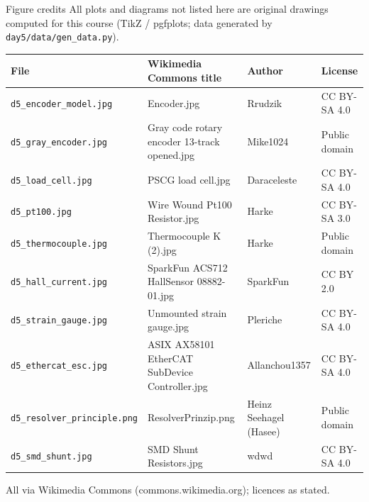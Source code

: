 \documentclass[aspectratio=169,10pt]{beamer}
\begin{document}
\begin{frame}{Figure credits}
\scriptsize
All plots and diagrams not listed here are original drawings computed for this course (TikZ / pgfplots; data generated by \texttt{day5/data/gen\_data.py}).

\vspace{2mm}
\renewcommand{\arraystretch}{1.15}
\begin{tabularx}{\linewidth}{@{}l X l l@{}}
\toprule
\textbf{File} & \textbf{Wikimedia Commons title} & \textbf{Author} & \textbf{License}\\
\midrule
\texttt{d5\_encoder\_model.jpg} & Encoder.jpg & Rrudzik & CC BY-SA 4.0\\
\texttt{d5\_gray\_encoder.jpg} & Gray code rotary encoder 13-track opened.jpg & Mike1024 & Public domain\\
\texttt{d5\_load\_cell.jpg} & PSCG load cell.jpg & Daraceleste & CC BY-SA 4.0\\
\texttt{d5\_pt100.jpg} & Wire Wound Pt100 Resistor.jpg & Harke & CC BY-SA 3.0\\
\texttt{d5\_thermocouple.jpg} & Thermocouple K (2).jpg & Harke & Public domain\\
\texttt{d5\_hall\_current.jpg} & SparkFun ACS712 HallSensor 08882-01.jpg & SparkFun & CC BY 2.0\\
\texttt{d5\_strain\_gauge.jpg} & Unmounted strain gauge.jpg & Pleriche & CC BY-SA 4.0\\
\texttt{d5\_ethercat\_esc.jpg} & ASIX AX58101 EtherCAT SubDevice Controller.jpg & Allanchou1357 & CC BY-SA 4.0\\
\texttt{d5\_resolver\_principle.png} & ResolverPrinzip.png & Heinz Seehagel (Hasee) & Public domain\\
\texttt{d5\_smd\_shunt.jpg} & SMD Shunt Resistors.jpg & wdwd & CC BY-SA 4.0\\
\bottomrule
\end{tabularx}

\vspace{1mm}
All via Wikimedia Commons (commons.wikimedia.org); licences as stated.
\end{frame}
\end{document}
